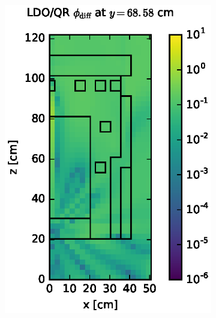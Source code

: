 \begin{figure}[!hbt]
\centering
\begin{subfigure}{0.4\textwidth}
\includegraphics[max height=0.445\textheight]
{img/dlvn-plots/fwd/flux-diff-rel-qr04.eps}
\end{subfigure} ~
\begin{subfigure}{0.4\textwidth}

\end{subfigure}
\end{figure}
